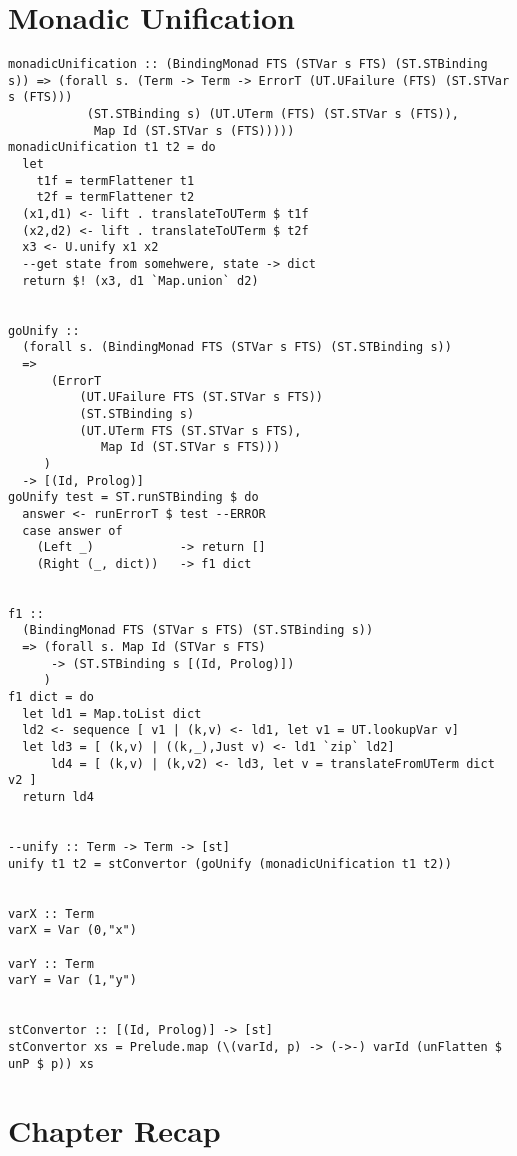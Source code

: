 \documentclass[thesis-solanki.tex]{files}
\begin{document}
\section{Monadic Unification}
\begin{verbatim}
monadicUnification :: (BindingMonad FTS (STVar s FTS) (ST.STBinding s)) => (forall s. (Term -> Term -> ErrorT (UT.UFailure (FTS) (ST.STVar s (FTS)))
           (ST.STBinding s) (UT.UTerm (FTS) (ST.STVar s (FTS)),
            Map Id (ST.STVar s (FTS)))))
monadicUnification t1 t2 = do
  let
    t1f = termFlattener t1
    t2f = termFlattener t2
  (x1,d1) <- lift . translateToUTerm $ t1f
  (x2,d2) <- lift . translateToUTerm $ t2f
  x3 <- U.unify x1 x2
  --get state from somehwere, state -> dict
  return $! (x3, d1 `Map.union` d2)


goUnify ::
  (forall s. (BindingMonad FTS (STVar s FTS) (ST.STBinding s))
  =>
      (ErrorT
          (UT.UFailure FTS (ST.STVar s FTS))
          (ST.STBinding s)
          (UT.UTerm FTS (ST.STVar s FTS),
             Map Id (ST.STVar s FTS)))
     )
  -> [(Id, Prolog)]
goUnify test = ST.runSTBinding $ do
  answer <- runErrorT $ test --ERROR
  case answer of
    (Left _)            -> return []
    (Right (_, dict))   -> f1 dict


f1 ::
  (BindingMonad FTS (STVar s FTS) (ST.STBinding s))
  => (forall s. Map Id (STVar s FTS)
      -> (ST.STBinding s [(Id, Prolog)])
     )
f1 dict = do
  let ld1 = Map.toList dict
  ld2 <- sequence [ v1 | (k,v) <- ld1, let v1 = UT.lookupVar v]
  let ld3 = [ (k,v) | ((k,_),Just v) <- ld1 `zip` ld2]
      ld4 = [ (k,v) | (k,v2) <- ld3, let v = translateFromUTerm dict v2 ]
  return ld4


--unify :: Term -> Term -> [st]
unify t1 t2 = stConvertor (goUnify (monadicUnification t1 t2))


varX :: Term
varX = Var (0,"x")

varY :: Term
varY = Var (1,"y")


stConvertor :: [(Id, Prolog)] -> [st]
stConvertor xs = Prelude.map (\(varId, p) -> (->-) varId (unFlatten $ unP $ p)) xs 
\end{verbatim}


\section{Chapter Recap}
\end{document}
